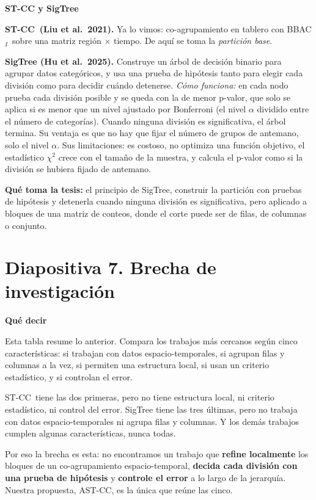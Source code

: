 \documentclass[11pt,a4paper]{article}
\newcommand{\cajainicio}[3]{\par\medskip\noindent
  \begin{lrbox}{\cajabox}\begin{minipage}{\dimexpr\linewidth-2\fboxsep-2\fboxrule\relax}%
  \textbf{\color{#1}#3}\par\smallskip}
\newcommand{\cajafin}[2]{\end{minipage}\end{lrbox}\fcolorbox{#1}{#2}{\usebox{\cajabox}}\par\medskip}
\newenvironment{guion}{\cajainicio{ucspblue}{ucspblue!6}{Qué decir}}{\cajafin{ucspblue}{ucspblue!6}}
\newenvironment{nota}[1]{\cajainicio{acc}{acc!7}{#1}}{\cajafin{acc}{acc!7}}
\newcommand{\STCC}{ST-CC}
\newcommand{\BBAC}{BBAC$_I$}
\begin{document}
\begin{nota}{ST-CC y SigTree}
\textbf{\STCC\ (Liu et al.\ 2021).} Ya lo vimos: co-agrupamiento en tablero con \BBAC\ sobre una matriz región $\times$ tiempo. De aquí se toma la \emph{partición base}.

\textbf{SigTree (Hu et al.\ 2025).} Construye un árbol de decisión binario para agrupar datos categóricos, y usa una prueba de hipótesis tanto para elegir cada división como para decidir cuándo detenerse. \textit{Cómo funciona:} en cada nodo prueba cada división posible y se queda con la de menor p-valor, que solo se aplica si es menor que un nivel ajustado por Bonferroni (el nivel $\alpha$ dividido entre el número de categorías). Cuando ninguna división es significativa, el árbol termina. Su ventaja es que no hay que fijar el número de grupos de antemano, solo el nivel $\alpha$. Sus limitaciones: es costoso, no optimiza una función objetivo, el estadístico $\chi^2$ crece con el tamaño de la muestra, y calcula el p-valor como si la división se hubiera fijado de antemano.

\textbf{Qué toma la tesis:} el principio de SigTree, construir la partición con pruebas de hipótesis y detenerla cuando ninguna división es significativa, pero aplicado a bloques de una matriz de conteos, donde el corte puede ser de filas, de columnas o conjunto.
\end{nota}

\newpage
\section*{Diapositiva 7. Brecha de investigación}

\begin{guion}
Esta tabla resume lo anterior. Compara los trabajos más cercanos según cinco características: si trabajan con datos espacio-temporales, si agrupan filas y columnas a la vez, si permiten una estructura local, si usan un criterio estadístico, y si controlan el error.

\STCC\ tiene las dos primeras, pero no tiene estructura local, ni criterio estadístico, ni control del error. SigTree tiene las tres últimas, pero no trabaja con datos espacio-temporales ni agrupa filas y columnas. Y los demás trabajos cumplen algunas características, nunca todas.

Por eso la brecha es esta: no encontramos un trabajo que \textbf{refine localmente} los bloques de un co-agrupamiento espacio-temporal, \textbf{decida cada división con una prueba de hipótesis} y \textbf{controle el error} a lo largo de la jerarquía. Nuestra propuesta, AST-CC, es la única que reúne las cinco.
\end{guion}
\end{document}
